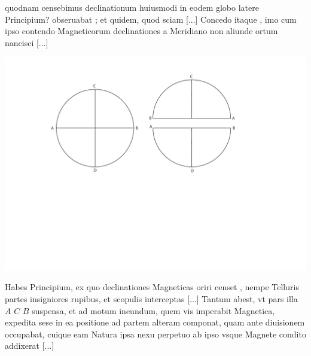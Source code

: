 \pend 
\pstart  [p. 188] [...] quodnam censebimus declinationum\protect{} huiusmodi in eodem globo latere Principium? obseruabat ; et quidem, quod sciam [...]
\pend 
\pstart  [p. 190] Concedo itaque , imo cum ipso contendo Magneticorum declinationes a Meridiano non aliunde ortum nancisci [...]
\pend 
\begin{center}                    
\includegraphics[width=1\textwidth]{images/leotaud1668-d4.pdf}\\
\noindent {} 
\end{center}
\vspace*{0.5em}
\pstart  [p. 191] Habes Principium\protect{}, ex quo declinationes\protect{} Magneticas oriri censet , nempe Telluris partes insigniores rupibus, et scopulis interceptas [...]
\pend 
\pstart  [p. 254] Tantum abest, vt pars illa $A$ $C$ $B$ suspensa, et ad motum ineundum, quem vis imperabit Magnetica, expedita sese in ea positione ad partem alteram componat, quam ante diuisionem occupabat, cuique eam Natura ipsa nexu perpetuo ab ipso vsque Magnete\protect{} condito addixerat [...]
